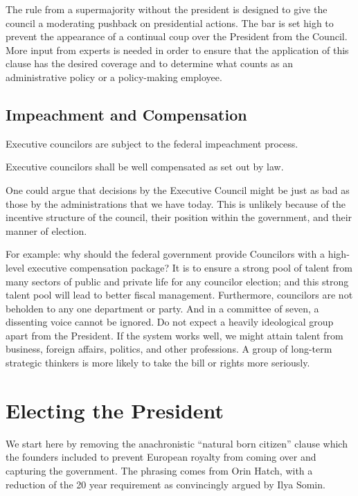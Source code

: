 \documentclass{article}
\begin{document}
The rule from a supermajority without the president is designed to give the council a moderating pushback on presidential actions. The bar is set high to prevent the appearance of a continual coup over the President from the Council. More input from experts is needed in order to ensure that the application of this clause has the desired coverage and to determine what counts as an administrative policy or a policy-making employee.

\subsection{Impeachment and Compensation}

\begin{quoting}
Executive councilors are subject to the federal impeachment process.

Executive councilors shall be well compensated as set out by law.
\end{quoting}

One could argue that decisions by the Executive Council might be just as bad as those by the administrations that we have today. This is unlikely because of the incentive structure of the council, their position within the government, and their manner of election.

For example: why should the federal government provide Councilors with a high-level executive compensation package? It is to ensure a strong pool of talent from many sectors of public and private life for any councilor election; and this strong talent pool will lead to better fiscal management. Furthermore, councilors are not beholden to any one department or party. And in a committee of seven, a dissenting voice cannot be ignored. Do not expect a heavily ideological group apart from the President. If the system works well, we might attain talent from business, foreign affairs, politics, and other professions. A group of long-term strategic thinkers is more likely to take the bill or rights more seriously.

\section{Electing the President}

We start here by removing the anachronistic “natural born citizen” clause which the founders included to prevent European royalty from coming over and capturing the government. The phrasing comes from Orin Hatch\cite{Somin_Hatch}, with a reduction of the 20 year requirement as convincingly argued by Ilya Somin\cite{Somin_NBC}.
\end{document}
